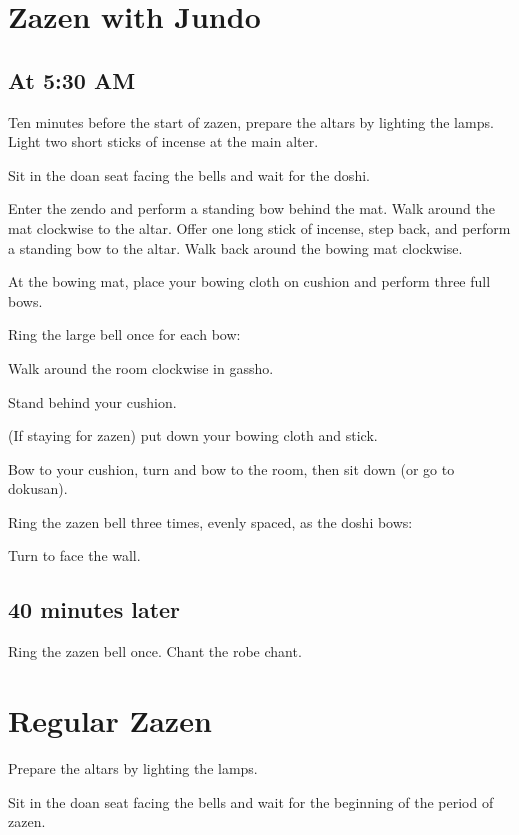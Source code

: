 \documentclass{kdo}
\begin{document}
\begin{services}

\chapter{Zazen with Jundo}

\renewcommand{\footmark}{\bellkey}
\section*{At 5:30 AM}

\doan Ten minutes before the start of zazen, prepare the altars by lighting the
lamps. Light two short sticks of incense at the main alter.

Sit in the doan seat facing the bells and wait for the doshi.

\doshi Enter the zendo and perform a standing bow behind the mat. Walk around
the mat clockwise to the altar. Offer one long stick of incense, step back, and
perform a standing bow to the altar. Walk back around the bowing mat clockwise.

At the bowing mat, place your bowing cloth on cushion and perform three full
bows.

\doan Ring the large bell once for each bow:
\jundoBows

\doshi Walk around the room clockwise in gassho.

Stand behind your cushion.

(If staying for zazen) put down your bowing cloth and stick.

Bow to your cushion, turn and bow to the room, then sit down (or go to dokusan).

\doan Ring the zazen bell three times, evenly spaced, as the doshi bows:
\jundoStartZazen

Turn to face the wall.

\section*{40 minutes later}
\doan Ring the zazen bell once. \bigspace\zazenbell
\sangha Chant the robe chant.

\chapter{Regular Zazen}
\doan Prepare the altars by lighting the lamps.

Sit in the doan seat facing the bells and wait for the beginning of the period
of zazen.


\end{services}
\end{document}
